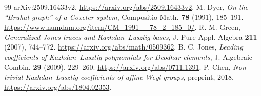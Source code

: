 \documentclass[11pt]{article}
\theoremstyle{definition}\newtheorem{definition}[theorem]{Definition}
\theoremstyle{remark}\newtheorem{remark}[theorem]{Remark}
\begin{document}
\begin{thebibliography}{99}
arXiv:2509.16433v2. \url{https://arxiv.org/abs/2509.16433v2}.
 M. Dyer, \emph{On the ``Bruhat graph'' of a Coxeter
system}, Compositio Math. \textbf{78} (1991), 185--191.
\url{https://www.numdam.org/item/CM_1991__78_2_185_0/}.
 R. M. Green, \emph{Generalized Jones traces and
Kazhdan--Lusztig bases}, J. Pure Appl. Algebra \textbf{211} (2007),
744--772. \url{https://arxiv.org/abs/math/0509362}.
 B. C. Jones, \emph{Leading coefficients of
Kazhdan--Lusztig polynomials for Deodhar elements}, J. Algebraic
Combin. \textbf{29} (2009), 229--260.
\url{https://arxiv.org/abs/0711.1391}.
 P. Chen, \emph{Non-trivial Kazhdan--Lusztig
coefficients of affine Weyl groups}, preprint, 2018.
\url{https://arxiv.org/abs/1804.02353}.
\end{thebibliography}
\end{document}
